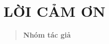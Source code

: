 \section*{LỜI CẢM ƠN}
\label{lux1eddi-cux1ea3m-ux1a1n}

\begin{quote}
\textbf{Nhóm tác giả}
\end{quote}
